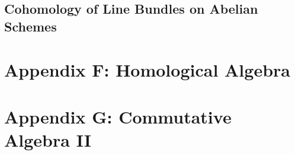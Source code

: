 \documentclass[11pt, a4paper]{article}
\begin{document}
\subsection{Cohomology of Line Bundles on Abelian Schemes}

\section*{Appendix F: Homological Algebra}

\section*{Appendix G: Commutative Algebra II}

\end{document}

